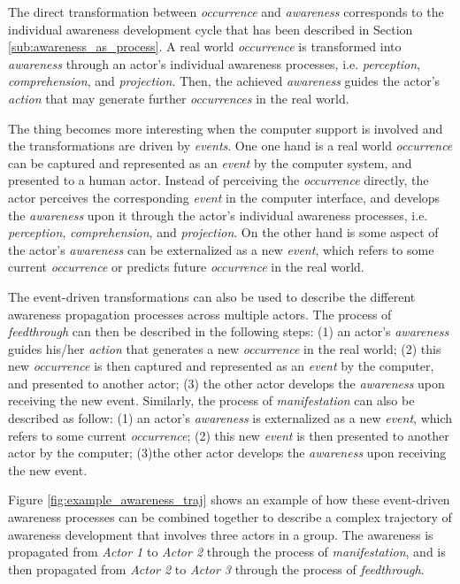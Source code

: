 The direct transformation between \emph{occurrence} and \emph{awareness} corresponds to the individual awareness development cycle that has been described in Section \ref{sub:awareness_as_process}. A real world \emph{occurrence} is transformed into \emph{awareness} through an actor's individual awareness processes, i.e. \emph{perception}, \emph{comprehension}, and \emph{projection}. Then, the achieved \emph{awareness} guides the actor's \emph{action} that may generate further \emph{occurrences} in the real world. 

The thing becomes more interesting when the computer support is involved and the transformations are driven by \emph{events}. One one hand is a real world \emph{occurrence} can be captured and represented as an \emph{event} by the computer system, and presented to a human actor. Instead of perceiving the \emph{occurrence} directly, the actor perceives the corresponding \emph{event} in the computer interface, and develops the \emph{awareness} upon it through the actor's individual awareness processes, i.e. \emph{perception}, \emph{comprehension}, and \emph{projection}. On the other hand is some aspect of the actor's \emph{awareness} can be externalized as a new \emph{event}, which refers to some current \emph{occurrence} or predicts future \emph{occurrence} in the real world.

The event-driven transformations can also be used to describe the different awareness propagation processes across multiple actors. The process of \emph{feedthrough} can then be described in the following steps: (1) an actor's \emph{awareness} guides his/her \emph{action} that generates a new \emph{occurrence} in the real world; (2) this new \emph{occurrence} is then captured and represented as an \emph{event} by the computer, and presented to another actor; (3) the other actor develops the \emph{awareness} upon receiving the new event. Similarly, the process of \emph{manifestation} can also be described as follow: (1) an actor's \emph{awareness} is externalized as a new \emph{event}, which refers to some current \emph{occurrence}; (2) this new \emph{event} is then presented to another actor by the computer; (3)the other actor develops the \emph{awareness} upon receiving the new event. 

Figure \ref{fig:example_awareness_traj} shows an example of how these event-driven awareness processes can be combined together to describe a complex trajectory of awareness development that involves three actors in a group. The awareness is propagated from \emph{Actor 1} to \emph{Actor 2} through the process of \emph{manifestation}, and is then propagated from \emph{Actor 2} to \emph{Actor 3} through the process of \emph{feedthrough}.

